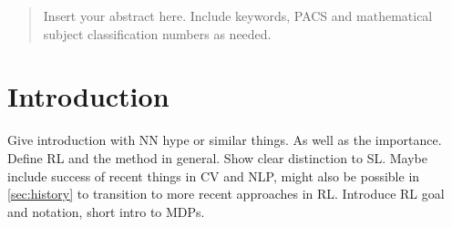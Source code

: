     \author{Fabian Otto
    }



    \date{Received: date / Accepted: date}


    \maketitle

    \begin{abstract}
        Insert your abstract here. Include keywords, PACS and mathematical
        subject classification numbers as needed.
    \end{abstract}

    \section{Introduction}
    \label{sec:intro}
    Give introduction with NN hype or similar things. As well as the importance.
    Define RL and the method in general.
    Show clear distinction to SL.
    Maybe include success of recent things in CV and NLP, might also be possible in \ref{sec:history} to transition to more recent approaches in RL. 
    Introduce RL goal and notation, short intro to MDPs.
    
